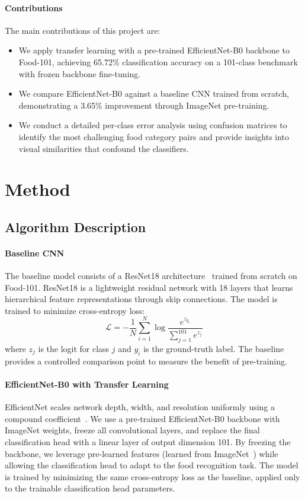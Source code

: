 \documentclass{article}
\begin{document}
\paragraph{Contributions}
The main contributions of this project are:
\begin{itemize}
    \item We apply transfer learning with a pre-trained EfficientNet-B0 backbone
          to Food-101, achieving 65.72\% classification accuracy on a
          101-class benchmark with frozen backbone fine-tuning.
    \item We compare EfficientNet-B0 against a baseline CNN trained from scratch,
          demonstrating a 3.65\% improvement through ImageNet pre-training.
    \item We conduct a detailed per-class error analysis using confusion matrices
          to identify the most challenging food category pairs and provide insights
          into visual similarities that confound the classifiers.
\end{itemize}

\section{Method}

\subsection{Algorithm Description}

\paragraph{Baseline CNN}
The baseline model consists of a ResNet18 architecture~\citep{he2016deep} trained from scratch on Food-101.
ResNet18 is a lightweight residual network with 18 layers that learns hierarchical
feature representations through skip connections. The model is trained to minimize cross-entropy loss:
\[
    \mathcal{L} = -\frac{1}{N}\sum_{i=1}^{N} \log \frac{e^{z_{y_i}}}{\sum_{j=1}^{101} e^{z_j}}
\]
where $z_j$ is the logit for class $j$ and $y_i$ is the ground-truth label. The baseline
provides a controlled comparison point to measure the benefit of pre-training.

\paragraph{EfficientNet-B0 with Transfer Learning}
EfficientNet scales network depth, width, and resolution uniformly using a
compound coefficient~\citep{tan2019efficientnet}. We use a pre-trained
EfficientNet-B0 backbone with ImageNet weights, freeze all convolutional layers,
and replace the final classification head with a linear layer of output
dimension 101. By freezing the backbone, we leverage pre-learned features (learned from ImageNet~\citep{krizhevsky2012imagenet}) while
allowing the classification head to adapt to the food recognition task. The model
is trained by minimizing the same cross-entropy loss as the baseline, applied only
to the trainable classification head parameters.
\end{document}
